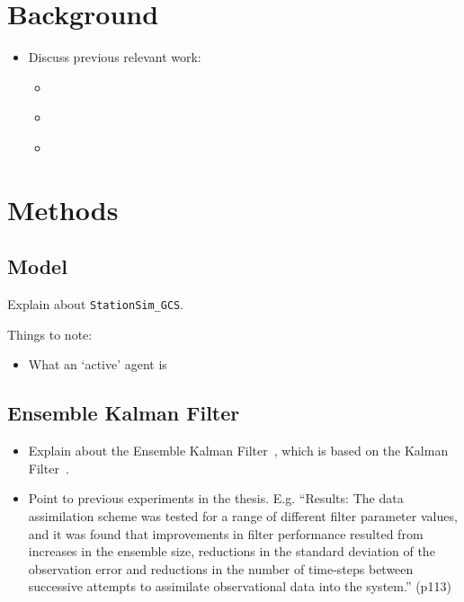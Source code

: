 \documentclass{article}
\begin{document}
\section{Background}\label{sec:background}

\begin{itemize}
    \item Discuss previous relevant work:
    \begin{itemize}
        \item \citet{ward2016dynamic}
        \item \citet{malleson2020simulating}
        \item \citet{clay2020towards}
    \end{itemize}
\end{itemize}


\section{Methods}\label{sec:methods}

\subsection{Model}\label{sub:methods:model}

Explain about \texttt{StationSim\_GCS}.

Things to note:
\begin{itemize}
  \item What an `active' agent is
\end{itemize}

\subsection{Ensemble Kalman Filter}\label{sub:methods:enkf}

\begin{itemize}
    \item Explain about the Ensemble Kalman Filter~\citep{evensen2003ensemble},
        which is based on the Kalman Filter~\citep{kalman1960new}.
    \item Point to previous experiments in the thesis. E.g. ``Results: The data assimilation scheme was tested for a range of different filter
parameter values, and it was found that improvements in filter performance
resulted from increases in the ensemble size, reductions in the standard
deviation of the observation error and reductions in the number of time-steps
between successive attempts to assimilate observational data into the system.'' (p113)
\end{itemize}
\end{document}
